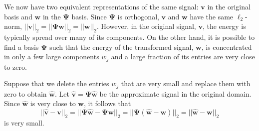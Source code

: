 We now have two equivalent representations of the same signal: $\bm v$ in the original basis and $\bm w$ in the $\bm\Psi$ basis.
Since $\bm\Psi$ is orthogonal, $\bm v$ and $\bm w$ have the same $\ell_2$-norm, $||\bm v||_2 = ||\bm\Psi\bm w||_2 = ||\bm w||_2$.
However, in the original signal, $\bm v$, the energy is typically spread over many of its components.
On the other hand, it is possible to find a basis $\bm\Psi$ such that the energy of the transformed signal, $\bm w$, is concentrated in only a few large components $w_j$ and a large fraction of its entries are very close to zero.

Suppose that we delete the entries $w_j$ that are very small and replace them with zero to obtain $\bm{\hat w}$.
Let $\bm{\hat v} = \bm\Psi\hat{\bm w}$ be the approximate signal in the original domain.
Since $\bm{\hat w}$ is very close to $\bm w$, it follows that
\begin{equation*}
  ||\bm{\hat v} - \bm v||_2 = ||\bm\Psi\bm{\hat w} - \bm\Psi\bm w||_2 = ||\bm\Psi (\bm{\hat w} - \bm w)||_2 = ||\bm{\hat w} - \bm w||_2
\end{equation*}
is very small.

